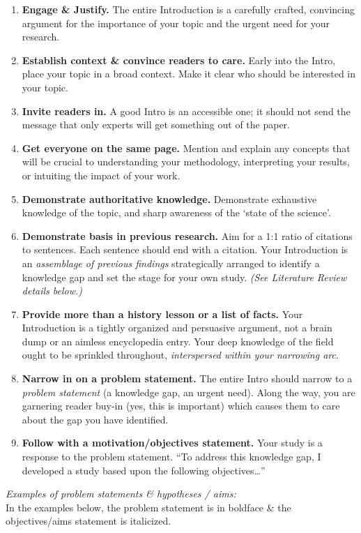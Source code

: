 \documentclass[]{book}
\begin{document}
\begin{enumerate}
\def\labelenumi{\arabic{enumi}.}
\item
  \textbf{Engage \& Justify.} The entire Introduction is a carefully crafted, convincing argument for the importance of your topic and the urgent need for your research.
\item
  \textbf{Establish context \& convince readers to care.} Early into the Intro, place your topic in a broad context. Make it clear who should be interested in your topic.
\item
  \textbf{Invite readers in.} A good Intro is an accessible one; it should not send the message that only experts will get something out of the paper.
\item
  \textbf{Get everyone on the same page.} Mention and explain any concepts that will be crucial to understanding your methodology, interpreting your results, or intuiting the impact of your work.
\item
  \textbf{Demonstrate authoritative knowledge.} Demonstrate exhaustive knowledge of the topic, and sharp awareness of the `state of the science'.
\item
  \textbf{Demonstrate basis in previous research.} Aim for a 1:1 ratio of citations to sentences. Each sentence should end with a citation. Your Introduction is an \emph{assemblage of previous findings} strategically arranged to identify a knowledge gap and set the stage for your own study. \emph{(See Literature Review details below.)}
\item
  \textbf{Provide more than a history lesson or a list of facts.} Your Introduction is a tightly organized and persuasive argument, not a brain dump or an aimless encyclopedia entry. Your deep knowledge of the field ought to be sprinkled throughout, \emph{interspersed within your narrowing arc}.
\item
  \textbf{Narrow in on a problem statement.} The entire Intro should narrow to a \emph{problem statement} (a knowledge gap, an urgent need). Along the way, you are garnering reader buy-in (yes, this is important) which causes them to care about the gap you have identified.
\item
  \textbf{Follow with a motivation/objectives statement.} Your study is a response to the problem statement. ``To address this knowledge gap, I developed a study based upon the following objectives\ldots{}''
\end{enumerate}

\emph{Examples of problem statements \& hypotheses / aims:}\\
In the examples below, the problem statement is in boldface \& the objectives/aims statement is italicized.
\end{document}
